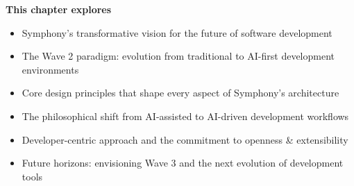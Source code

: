 \begin{tcolorbox}[
    enhanced,
    colback=white,
    colframe=brandSecondary!40,
    boxrule=1.5pt,
    arc=15pt,
    drop shadow={brandSecondary!25},
    left=1.5cm,
    right=1.5cm,
    top=1.2cm,
    bottom=1.2cm
]
\begin{center}
{\Large\textbf{\textcolor{brandSecondary}{This chapter explores}}}
\end{center}

\vspace{0.8cm}

\begin{itemize}[leftmargin=1.2cm, itemsep=0.4cm, label={\textcolor{brandSecondary}{$\blacktriangleright$}}]
    \item {\large Symphony's transformative vision for the future of software development}
    \item {\large The Wave 2 paradigm: evolution from traditional to AI-first development environments}
    \item {\large Core design principles that shape every aspect of Symphony's architecture}
    \item {\large The philosophical shift from AI-assisted to AI-driven development workflows}
    \item {\large Developer-centric approach and the commitment to openness \& extensibility}
    \item {\large Future horizons: envisioning Wave 3 and the next evolution of development tools}
\end{itemize}
\end{tcolorbox}

\clearpage
